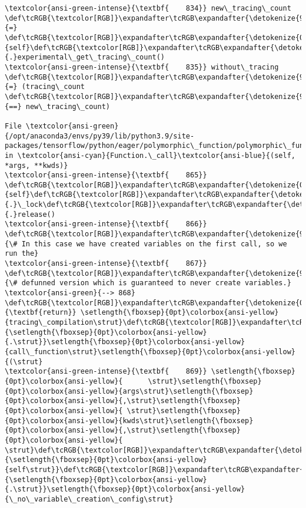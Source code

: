 \documentclass[11pt]{article}
\begin{document}
\begin{Verbatim}[commandchars=\\\{\}, frame=single, framerule=2mm, rulecolor=\color{outerrorbackground}]
\textcolor{ansi-green-intense}{\textbf{    834}} new\_tracing\_count \def\tcRGB{\textcolor[RGB]}\expandafter\tcRGB\expandafter{\detokenize{98,98,98}}{=} \def\tcRGB{\textcolor[RGB]}\expandafter\tcRGB\expandafter{\detokenize{0,135,0}}{self}\def\tcRGB{\textcolor[RGB]}\expandafter\tcRGB\expandafter{\detokenize{98,98,98}}{.}experimental\_get\_tracing\_count()
\textcolor{ansi-green-intense}{\textbf{    835}} without\_tracing \def\tcRGB{\textcolor[RGB]}\expandafter\tcRGB\expandafter{\detokenize{98,98,98}}{=} (tracing\_count \def\tcRGB{\textcolor[RGB]}\expandafter\tcRGB\expandafter{\detokenize{98,98,98}}{==} new\_tracing\_count)

File \textcolor{ansi-green}{/opt/anaconda3/envs/py39/lib/python3.9/site-packages/tensorflow/python/eager/polymorphic\_function/polymorphic\_function.py:868}, in \textcolor{ansi-cyan}{Function.\_call}\textcolor{ansi-blue}{(self, *args, **kwds)}
\textcolor{ansi-green-intense}{\textbf{    865}}   \def\tcRGB{\textcolor[RGB]}\expandafter\tcRGB\expandafter{\detokenize{0,135,0}}{self}\def\tcRGB{\textcolor[RGB]}\expandafter\tcRGB\expandafter{\detokenize{98,98,98}}{.}\_lock\def\tcRGB{\textcolor[RGB]}\expandafter\tcRGB\expandafter{\detokenize{98,98,98}}{.}release()
\textcolor{ansi-green-intense}{\textbf{    866}}   \def\tcRGB{\textcolor[RGB]}\expandafter\tcRGB\expandafter{\detokenize{95,135,135}}{\# In this case we have created variables on the first call, so we run the}
\textcolor{ansi-green-intense}{\textbf{    867}}   \def\tcRGB{\textcolor[RGB]}\expandafter\tcRGB\expandafter{\detokenize{95,135,135}}{\# defunned version which is guaranteed to never create variables.}
\textcolor{ansi-green}{--> 868}   \def\tcRGB{\textcolor[RGB]}\expandafter\tcRGB\expandafter{\detokenize{0,135,0}}{\textbf{return}} \setlength{\fboxsep}{0pt}\colorbox{ansi-yellow}{tracing\_compilation\strut}\def\tcRGB{\textcolor[RGB]}\expandafter\tcRGB\expandafter{\detokenize{98,98,98}}{\setlength{\fboxsep}{0pt}\colorbox{ansi-yellow}{.\strut}}\setlength{\fboxsep}{0pt}\colorbox{ansi-yellow}{call\_function\strut}\setlength{\fboxsep}{0pt}\colorbox{ansi-yellow}{(\strut}
\textcolor{ansi-green-intense}{\textbf{    869}} \setlength{\fboxsep}{0pt}\colorbox{ansi-yellow}{      \strut}\setlength{\fboxsep}{0pt}\colorbox{ansi-yellow}{args\strut}\setlength{\fboxsep}{0pt}\colorbox{ansi-yellow}{,\strut}\setlength{\fboxsep}{0pt}\colorbox{ansi-yellow}{ \strut}\setlength{\fboxsep}{0pt}\colorbox{ansi-yellow}{kwds\strut}\setlength{\fboxsep}{0pt}\colorbox{ansi-yellow}{,\strut}\setlength{\fboxsep}{0pt}\colorbox{ansi-yellow}{ \strut}\def\tcRGB{\textcolor[RGB]}\expandafter\tcRGB\expandafter{\detokenize{0,135,0}}{\setlength{\fboxsep}{0pt}\colorbox{ansi-yellow}{self\strut}}\def\tcRGB{\textcolor[RGB]}\expandafter\tcRGB\expandafter{\detokenize{98,98,98}}{\setlength{\fboxsep}{0pt}\colorbox{ansi-yellow}{.\strut}}\setlength{\fboxsep}{0pt}\colorbox{ansi-yellow}{\_no\_variable\_creation\_config\strut}

\end{Verbatim}
\end{document}
